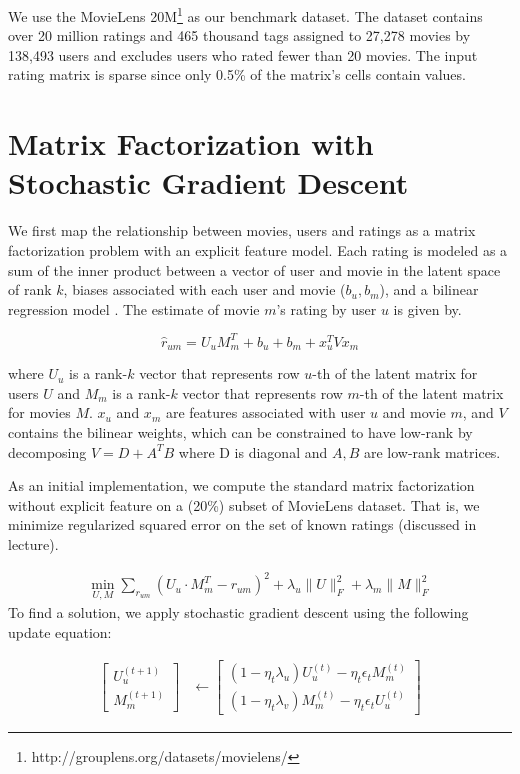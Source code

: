 \documentclass{article} %
\newcommand{\U}{U}
\newcommand{\M}{M}
\begin{document}
We use the MovieLens 20M\footnote{http://grouplens.org/datasets/movielens/}
as our benchmark dataset.  The dataset contains over 20 million ratings and 465 thousand tags assigned to 27,278 movies by 138,493 users and excludes users who rated fewer than 20 movies. The input rating matrix is sparse since only 0.5\% of the matrix's cells contain values.




\section{Matrix Factorization with Stochastic Gradient Descent}

We first map the relationship between movies, users and ratings
as a matrix factorization problem with an explicit feature model.
Each rating is modeled as a sum of the inner product between a vector of user and movie in the latent space of rank $k$, biases associated with each user and movie ($b_u, b_m$), and a bilinear regression model \cite{gabriel1998generalised}. The estimate of movie $m$'s rating by user $u$ is given by.

\[
  \hat{r}_{um} = \U_u \M_m^T + b_u + b_m + x_u^T V x_m
  \label{eq:estimate}
\]

where $\U_u$ is a rank-$k$ vector that represents row $u$-th of the latent matrix for users $\U$ and $\M_m$ is a rank-$k$ vector that represents row $m$-th of the latent matrix for movies $\M$. $x_u$ and $x_m$ are features associated with user $u$ and movie $m$, and $V$ contains the bilinear weights, which can be constrained to have low-rank by decomposing $V=D + A^TB$ where D is diagonal and $A,B$ are low-rank matrices.

As an initial implementation, we compute the standard matrix factorization without explicit feature on a (20\%) subset of MovieLens dataset. That is, we minimize regularized squared error on the set of known ratings (discussed in lecture).

\begin{align}
  \min_{\U,\M} \sum_{r_{um}} (\U_u \cdot \M_m^T - r_{um})^2
  + \lambda_u \|\U\|^2_F + \lambda_m \|\M\|^2_F
\end{align}
To find a solution, we apply stochastic gradient descent using the following update equation:

\begin{align}
\left[\begin{array}{c}
\U_u^{(t+1)}
\\
\M_m^{(t+1)}
\end{array}\right]
& \leftarrow
\left[\begin{array}{c}
(1-\eta_t \lambda_u) \U_u^{(t)} - \eta_t \epsilon_t \M_m^{(t)}
\\
(1-\eta_t \lambda_v) \M_m^{(t)} - \eta_t \epsilon_t \U_u^{(t)}
\end{array}\right]
\label{eq:update}
\end{align}
\end{document}
